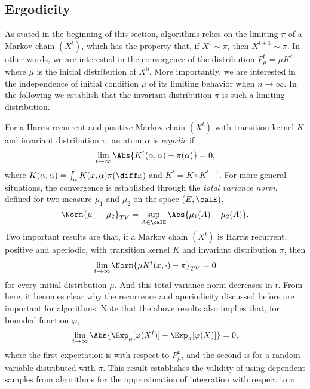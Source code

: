 \subsection{Ergodicity}
\label{sub: Appdendix Ergodicity}

As stated in the beginning of this section, \mcmc algorithms relies on the
limiting $\pi$ of a Markov chain $(X^t)$, which has the property that, if
$X^t\sim\pi$, then $X^{t+1}\sim\pi$. In other words, we are interested in the
convergence of the distribution $P_{\mu}^t = \mu K^t$ where $\mu$ is the
initial distribution of $X^0$. More importantly, we are interested in the
independence of initial condition $\mu$ of its limiting behavior when
$n\to\infty$. In the following we establish that the invariant distribution
$\pi$ is such a limiting distribution.

For a Harris recurrent and positive Markov chain $(X^t)$ with transition
kernel $K$ and invariant distribution $\pi$, an atom $\alpha$ is
\emph{ergodic} if
\begin{equation}
  \lim_{t\to\infty}\Abs{K^t(\alpha,\alpha) - \pi(\alpha)} = 0,
\end{equation}
where $K(\alpha,\alpha) = \int_{\alpha}K(x,\alpha)\pi(\diff x)$ and $K^t =
K\vysmwhtcircle K^{t-1}$. For more general situations, the convergence is
established through the \emph{total variance norm}, defined for two measure
$\mu_1$ and $\mu_2$ on the space $(E,\calE)$,
\begin{equation}
  \Norm{\mu_1-\mu_2}_{TV} = \sup_{A\in\calE}\Abs{\mu_1(A) - \mu_2(A)}.
\end{equation}
Two important results are that, if a Markov chain $(X^t)$ is Harris recurrent,
positive and aperiodic, with transition kernel $K$ and invariant distribution
$\pi$, then
\begin{equation}
  \lim_{t\to\infty}\Norm{\mu K^t(x,\cdot) - \pi}_{TV} = 0
\end{equation}
for every initial distribution $\mu$. And this total variance norm decreases
in $t$. From here, it becomes clear why the recurrence and aperiodicity
discussed before are important for \mcmc algorithms. Note that the above
results also implies that, for bounded function $\varphi$,
\begin{equation}
  \lim_{t\to\infty}\Abs{\Exp_{\mu}[\varphi(X^t)] - \Exp_{\pi}[\varphi(X)]}
  = 0,
\end{equation}
where the first expectation is with respect to $P_{\mu}^n$, and the second is
for a random variable distributed with $\pi$. This result establishes the
validity of using dependent samples from \mcmc algorithms for the
approximation of integration with respect to $\pi$.

